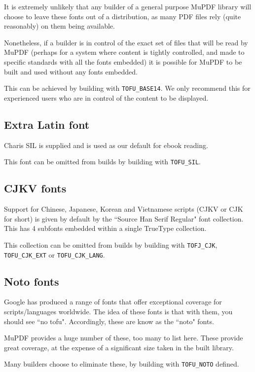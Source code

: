 \documentclass[oneside]{book}
\begin{document}
It is extremely unlikely that any builder of a general purpose MuPDF library will choose to leave these fonts out of a distribution, as many PDF files rely (quite reasonably) on them being available.

Nonetheless, if a builder is in control of the exact set of files that will be read by MuPDF (perhaps for a system where content is tightly controlled, and made to specific standards with all the fonts embedded) it is possible for MuPDF to be built and used without any fonts embedded.

This can be achieved by building with \texttt{TOFU\_BASE14}. We only recommend this for experienced users who are in control of the content to be displayed.

\subsection{Extra Latin font}

Charis SIL is supplied and is used as our default for ebook reading.

This font can be omitted from builds by building with \texttt{TOFU\_SIL}.

\subsection{CJKV fonts}

Support for Chinese, Japanese, Korean and Vietnamese scripts (CJKV or CJK for short) is given by default by the ``Source Han Serif Regular" font collection. This has 4 subfonts embedded within a single TrueType collection.

This collection can be omitted from builds by building with \texttt{TOFJ\_CJK}, \texttt{TOFU\_CJK\_EXT} or \texttt{TOFU\_CJK\_LANG}.

\subsection{Noto fonts}

Google has produced a range of fonts that offer exceptional coverage for scripts/languages worldwide. The idea of these fonts is that with them, you should see ``no tofu". Accordingly, these are know as the ``noto" fonts.

MuPDF provides a huge number of these, too many to list here. These provide great coverage, at the expense of a significant size taken in the built library.

Many builders choose to eliminate these, by building with \texttt{TOFU\_NOTO} defined.
\end{document}
